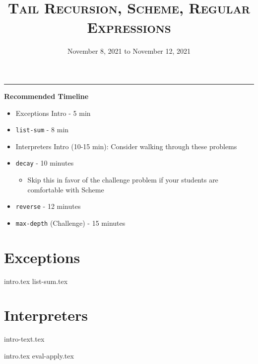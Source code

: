 \documentclass{exam}
\title{\textsc{Tail Recursion, Scheme, Regular Expressions}}
\date{November 8, 2021 to November 12, 2021}
\begin{document}
\maketitle
\rule{\textwidth}{0.15em}
\fontsize{12}{15}\selectfont

\begin{guide}
\begin{blocksection}
    \textbf{Recommended Timeline}
    \begin{itemize}
  	\item Exceptions Intro - 5 min
        \item \lstinline{list-sum} - 8 min
  	\item Interpreters Intro (10-15 min): Consider walking through these problems
        \item \lstinline{decay} - 10 minutes
        \begin{itemize}
            \item Skip this in favor of the challenge problem if your students are comfortable with Scheme
        \end{itemize}
        \item \lstinline{reverse} - 12 minutes
        \item \lstinline{max-depth} (Challenge) - 15 minutes
    \end{itemize}
\end{blocksection}
\newpage
\end{guide}



\newpage
\section{Exceptions}
\begin{questions}
{intro.tex}
{list-sum.tex}
\end{questions}

\section{Interpreters}
{intro-text.tex}
\begin{questions}
{intro.tex}
{eval-apply.tex}
\end{questions}
\end{document}
